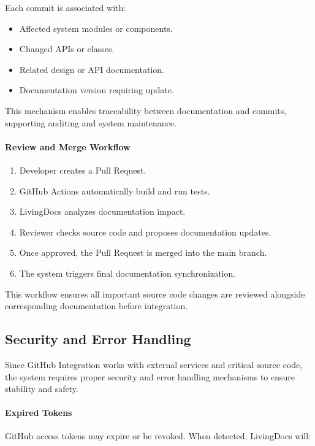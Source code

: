 Each commit is associated with:

\begin{itemize}
    \item Affected system modules or components.
    \item Changed APIs or classes.
    \item Related design or API documentation.
    \item Documentation version requiring update.
\end{itemize}

This mechanism enables traceability between documentation and commits, supporting auditing and system maintenance.

\paragraph{Review and Merge Workflow}

\begin{enumerate}
    \item Developer creates a Pull Request.
    \item GitHub Actions automatically build and run tests.
    \item LivingDocs analyzes documentation impact.
    \item Reviewer checks source code and proposes documentation updates.
    \item Once approved, the Pull Request is merged into the main branch.
    \item The system triggers final documentation synchronization.
\end{enumerate}

This workflow ensures all important source code changes are reviewed alongside corresponding documentation before integration.

\subsection{Security and Error Handling}

Since GitHub Integration works with external services and critical source code, the system requires proper security and error handling mechanisms to ensure stability and safety.

\paragraph{Expired Tokens}

GitHub access tokens may expire or be revoked. When detected, LivingDocs will:

